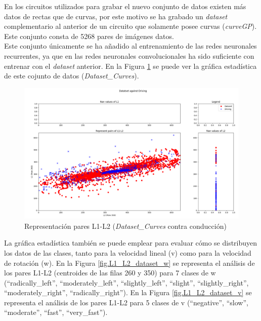 En los circuitos utilizados para grabar el nuevo conjunto de datos existen más datos de rectas que de curvas, por este motivo se ha grabado un \textit{dataset} complementario al anterior de un circuito que solamente posee curvas (\textit{curveGP}). Este conjunto consta de 5268 pares de imágenes datos.\\

Este conjunto únicamente se ha añadido al entrenamiento de las redes neuronales recurrentes, ya que en las redes neuronales convolucionales ha sido suficiente con entrenar con el \textit{dataset} anterior. En la Figura \ref{fig.L1_L2_dataset_curves} se puede ver la gráfica estadística de este cojunto de datos (\textit{Dataset\_Curves}).\\

\begin{figure}[H]
  \begin{center}
    \includegraphics[width=1\textwidth]{figures/Infraestructura/L1_L2_Dataset_Curves.png}
		\caption{Representación pares L1-L2 (\textit{Dataset\_Curves} contra conducción)}
		\label{fig.L1_L2_dataset_curves}
		\end{center}
\end{figure}

La gráfica estadística también se puede emplear para evaluar cómo se distribuyen los datos de las clases, tanto para la velocidad lineal (v) como para la velocidad de rotación (w). En la Figura \ref{fig.L1_L2_dataset_w} se representa el análisis de los pares L1-L2 (centroides de las filas 260 y 350) para 7 clases de w (``radically\_left'', ``moderately\_left'', ``slightly\_left'', ``slight'', ``slightly\_right'', ``moderately\_right'', ``radically\_right''). En la Figura \ref{fig.L1_L2_dataset_v} se representa el análisis de los pares L1-L2 para 5 clases de v (``negative'', ``slow'', ``moderate'', ``fast'', ``very\_fast''). \\

